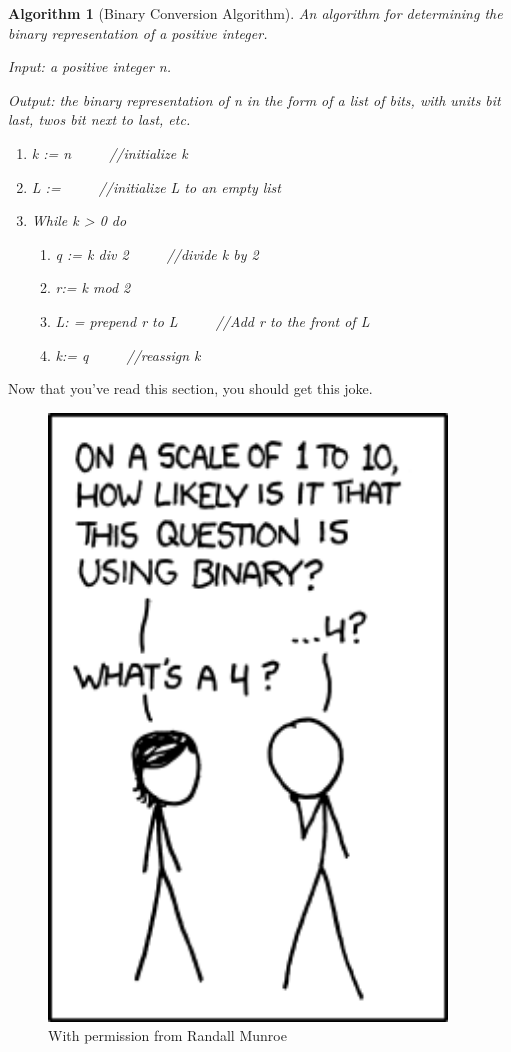 \documentclass[10pt,]{book}
\theoremstyle{plain}
\newtheorem{algorithm}[theorem]{Algorithm}
\theoremstyle{definition}
\begin{document}
\begin{algorithm}[Binary Conversion Algorithm]\label{binary_conversion_algorithm}
 An algorithm for determining the binary representation of a positive integer.%
\par
Input: a positive integer n.%
\par
Output: the binary representation of n in the form of a list of bits, with units bit last, twos bit next to last, etc.%
\leavevmode%
\begin{enumerate}
\item\hypertarget{li-142}{}k := n \(\qquad  \)     //initialize k\item\hypertarget{li-143}{}L := { } \(\qquad  \)   //initialize L to an empty list\item\hypertarget{li-144}{} While k > 0 do 
   \begin{enumerate}
\item\hypertarget{li-145}{} q := k div 2		\(\qquad  \)	//divide k by 2\item\hypertarget{li-146}{} r:= k mod 2 \item\hypertarget{li-147}{}L: = prepend r to L \(\qquad  \) //Add r to the front of L \item\hypertarget{li-148}{} k:= q   			\(\qquad  \)	//reassign k\end{enumerate}
\end{enumerate}
\end{algorithm}
\par
Now that you've read this section, you should get this joke.%
\leavevmode%
\begin{figure}
\centering
\includegraphics[width=300pt,]{images/1_to_10.png}\caption{With permission from Randall Munroe
                \label{onetoten}}
\end{figure}
\end{document}
